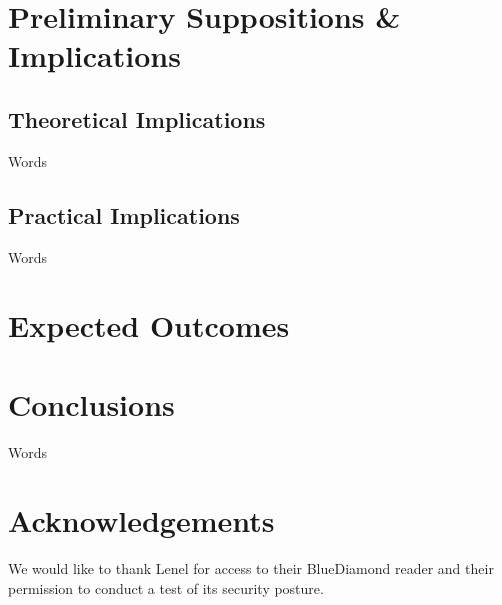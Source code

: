 \documentclass[10pt,twocolumn,letterpaper]{article}
\begin{document}
\section{Preliminary Suppositions \& Implications}

\subsection{Theoretical Implications}
Words

\subsection{Practical Implications}
Words

\section{Expected Outcomes}

\section{Conclusions}
Words

\section{Acknowledgements}
We would like to thank Lenel for access to their BlueDiamond reader and their permission to conduct a test of its security posture.




\end{document}
